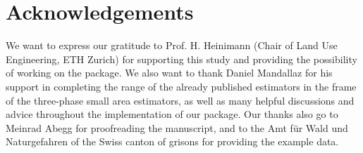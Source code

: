 
\section*{Acknowledgements}

We want to express our gratitude to Prof. H. Heinimann (Chair of Land Use Engineering, ETH Zurich) for supporting this study and providing the possibility of working on the package. We also want to thank Daniel Mandallaz for his support in completing the range of the already published estimators in the frame of the three-phase small area estimators, as well as many helpful discussions and advice throughout the implementation of our package. Our thanks also go to Meinrad Abegg for proofreading the manuscript, and to the Amt f{\"u}r Wald und Naturgefahren of the Swiss canton of grisons for providing the example data.

